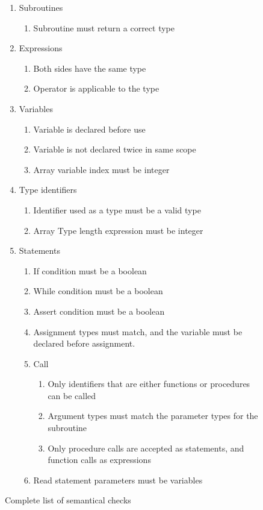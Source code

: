 \documentclass[12pt,a4paper]{article}
\begin{document}
\begin{figure}
\caption{Complete list of semantical checks}
\begin{enumerate}
  \item Subroutines
    \begin{enumerate}
      \item Subroutine must return a correct type
    \end{enumerate}
  \item Expressions
    \begin{enumerate}
      \item Both sides have the same type
      \item Operator is applicable to the type
    \end{enumerate}
  \item Variables
    \begin{enumerate}
      \item Variable is declared before use
      \item Variable is not declared twice in same scope
      \item Array variable index must be integer
    \end{enumerate}
  \item Type identifiers 
    \begin{enumerate}
      \item Identifier used as a type must be a valid type
      \item Array Type length expression must be integer
    \end{enumerate}
  \item Statements
    \begin{enumerate}
      \item If condition must be a boolean
      \item While condition must be a boolean
      \item Assert condition must be a boolean
      \item Assignment types must match, and the variable must be declared before assignment.
      \item Call
        \begin{enumerate}
          \item Only identifiers that are either functions or procedures can be called
          \item Argument types must match the parameter types for the subroutine
          \item Only procedure calls are accepted as statements, and function calls as expressions
        \end{enumerate}
  \item Read statement parameters must be variables

    \end{enumerate}

\end{enumerate}

\end{figure}
\end{document}
